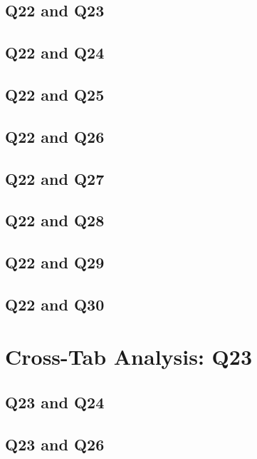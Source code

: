 \documentclass{report}
\begin{document}
\section{Q22 and Q23}


\clearpage
\section{Q22 and Q24}


\clearpage
\section{Q22 and Q25}


\clearpage
\section{Q22 and Q26}


\clearpage
\section{Q22 and Q27}


\clearpage
\section{Q22 and Q28}


\clearpage
\section{Q22 and Q29}


\clearpage
\section{Q22 and Q30}


\chapter{Cross-Tab Analysis: Q23}
\section{Q23 and Q24}


\clearpage
\section{Q23 and Q26}

\end{document}
